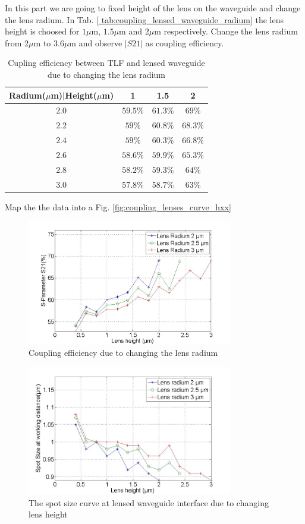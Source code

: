 In this part we are going to fixed height of the lens on the waveguide and change the lens radium.
In Tab. \ref{ tab:coupling_lensed_waveguide_radium} the lens height is choosed for $1\mu$m, $1.5\mu$m and $2\mu$m respectively. Change the lens radium from $2\mu$m to $3.6\mu$m and observe $|S21|$ as coupling efficiency.

\begin{table}
\caption{Cupling efficiency between TLF and lensed waveguide due to changing the lens radium}
\begin{tabular}{|c|c|c|c|}
\hline
Radium($\mu$m)|Height($\mu$m)&	1&	1.5&2\\
\hline
$2.0$& $59.5\%$	&$61.3\%$	&$69\%$\\
$2.2$& $59\%$		&$60.8\%$	&$68.3\%$\\
$2.4$&$59\%$		&$60.3\%$	&$66.8\%$\\
$2.6$&$58.6\%$	&$59.9\%$	&$65.3\%$\\
$2.8$&$58.2\%$	&$59.3\%$	&$64\%$\\
$3.0$&$57.8\%$	&$58.7\%$	&$63\%$\\
\hline
\end{tabular}
\label{tab:coupling_lensed_waveguide_radium}
\end{table}
Map the the data into a Fig. \ref{fig:coupling_lenses_curve_hxx}
\begin{figure}[!ht]
\includegraphics[width=0.8\textwidth]{bilder/s21_fix_lens_radium_hxx}
\caption{Coupling efficiency due to changing the lens radium}
\label{fig: coupling_lenses_curve_hxx}
\end{figure}


\begin{figure}[!ht]
\includegraphics[width=0.8\textwidth]{bilder/spot_fix_lens_radium_hxx}
\caption{The spot size curve at lensed waveguide interface due to changing lens height}
\label{fig: fig: lensed_guide_spot_size_ curve}
\end{figure}
